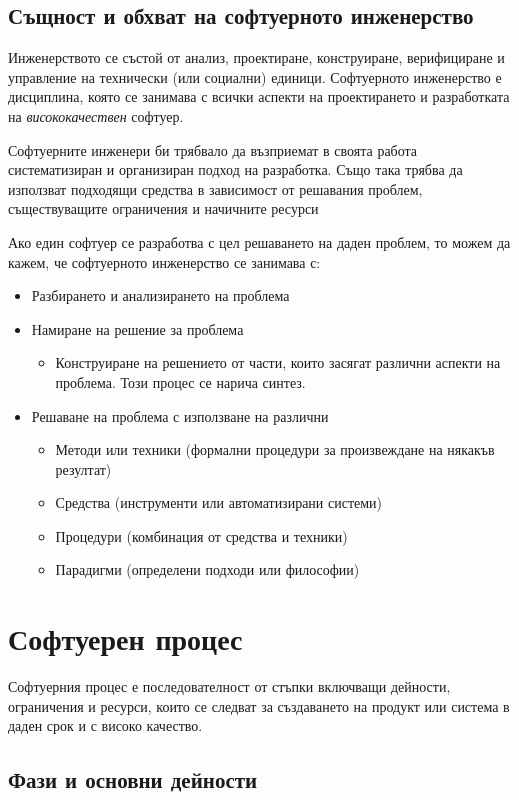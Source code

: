\documentclass[fleqn,12pt]{article}
\begin{document}
\subsection{Същност и обхват на софтуерното инженерство}
Инженерството се състой от анализ, проектиране, конструиране, верифициране и управление на технически (или социални) единици. Софтуерното инженерство е дисциплина, която се занимава с всички аспекти на проектирането и разработката на \textit{висококачествен} софтуер.

Софтуерните инженери би трябвало да възприемат в своята работа систематизиран и организиран подход на разработка. Също така трябва да използват подходящи средства в зависимост от решавания проблем, съществуващите ограничения и начичните ресурси

Ако един софтуер се разработва с цел решаването на даден проблем, то можем да кажем, че софтуерното инженерство се занимава с:
\begin{itemize}
	\item Разбирането и анализирането на проблема
	\item Намиране на решение за проблема
	\begin{itemize}
		\item Конструиране на решението от части, които засягат различни аспекти на проблема. Този процес се нарича синтез.
	\end{itemize}
	\item Решаване на проблема с използване на различни
	\begin{itemize}
		\item Методи или техники (формални процедури за произвеждане на някакъв резултат)
		\item Средства (инструменти или автоматизирани системи)
		\item Процедури (комбинация от средства и техники)
		\item Парадигми (определени подходи или философии)
	\end{itemize}
\end{itemize}

\section{Софтуерен  процес}

Софтуерния процес е последователност от стъпки включващи дейности, ограничения и ресурси, които се следват за създаването на продукт или система в даден срок и с високо качество.

\subsection{Фази и  основни  дейности}
\end{document}
